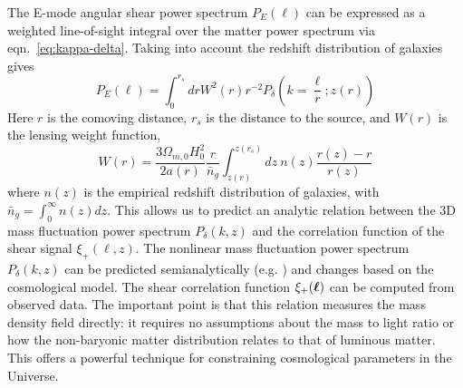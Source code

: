The E-mode angular shear power spectrum $P_E(\ell)$ can be expressed as a
weighted line-of-sight integral over the matter power 
spectrum via eqn.~\ref{eq:kappa-delta}.  Taking into account the redshift
distribution of galaxies gives \citep[see][]{Takada04}
\begin{equation}
  \label{eq:P_gamma}
  P_E(\ell) = \int_0^{r_s}dr W^2(r)r^{-2}
  P_\delta\left(k=\frac{\ell}{r};z(r)\right)
\end{equation}
Here $r$ is the comoving distance, $r_s$ is the distance to the
source, and $W(r)$ is the lensing weight function,
\begin{equation}
  \label{eq:lensing_weight}
  W(r) = \frac{3\Omega_{m,0}H_0^2}{2a(r)}\frac{r}{\bar{n}_g}
  \int_{z(r)}^{z(r_s)}dz\ n(z) \frac{r(z)-r}{r(z)}
\end{equation}
where $n(z)$ is the empirical redshift distribution of galaxies,
with $\bar{n}_g = \int_0^\infty n(z)dz$.
This allows us to predict an analytic relation between the 3D mass
fluctuation power spectrum $P_\delta(k, z)$ and the correlation function
of the shear signal $\xi_+(\ell, z)$.
The nonlinear mass fluctuation power spectrum $P_\delta(k, z)$ can be
predicted semianalytically (e.g. \citet{Smith03}) and changes based on
the cosmological model.  The shear correlation function $\xi_+(\boldsymbol{\ell})$
can be computed from observed data.  The important point is that this
relation measures the mass density field directly: it requires no assumptions
about the mass to light ratio or how the non-baryonic matter distribution
relates to that of luminous matter.
This offers a powerful technique for constraining cosmological parameters
in the Universe.
